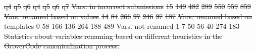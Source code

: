 \documentclass[12pt,twoside]{mitthesis}
\providecommand{\DIFdeltex}[1]{{\protect\color{red}\sout{#1}}}                      %
\providecommand{\DIFdelFL}[1]{\DIFdel{#1}} %
\providecommand{\DIFdel}[1]{\texorpdfstring{\DIFdeltex{#1}}{}} %
\begin{document}
{{{{{{{{{{%
\DIFdelFL{q4 }%
\DIFdelFL{q5 }%
\DIFdelFL{q6 }%
\DIFdelFL{q4 }%
\DIFdelFL{q5 }%
\DIFdelFL{q6 }%
\DIFdelFL{q7 }%
\DIFdelFL{Vars. in incorrect submissions }%
\DIFdelFL{15 }%
\DIFdelFL{149 }%
\DIFdelFL{482 }%
\DIFdelFL{289 }%
\DIFdelFL{550 }%
\DIFdelFL{559 }%
\DIFdelFL{859 }%
\DIFdelFL{Vars. renamed based on values }%
\DIFdelFL{14 }%
\DIFdelFL{84 }%
\DIFdelFL{266 }%
\DIFdelFL{97 }%
\DIFdelFL{246 }%
\DIFdelFL{97 }%
\DIFdelFL{187 }%
\DIFdelFL{Vars. renamed based on templates }%
\DIFdelFL{0 }%
\DIFdelFL{58 }%
\DIFdelFL{166 }%
\DIFdelFL{136 }%
\DIFdelFL{264 }%
\DIFdelFL{188 }%
\DIFdelFL{489 }%
\DIFdelFL{Vars. not renamed }%
\DIFdelFL{1 }%
\DIFdelFL{7 }%
\DIFdelFL{50 }%
\DIFdelFL{56 }%
\DIFdelFL{40 }%
\DIFdelFL{274 }%
\DIFdelFL{183 }%
{%
\DIFdelFL{Statistics about variables renaming based on different heuristics in the GroverCode canonicalization process.}}

}}}}}}}}}}
\end{document}
